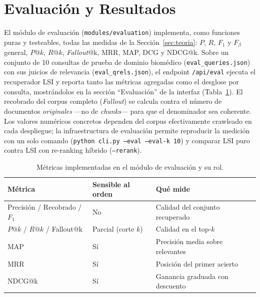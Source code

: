 \documentclass[runningheads,a4paper,14pts]{llncs}
\begin{document}
	\section{Evaluación y Resultados}\label{sec:evaluacion}
	
	El módulo de evaluación (\texttt{modules/evaluation}) implementa, como funciones
	puras y testeables, todas las medidas de la Sección~\ref{sec:teoria}: $P$, $R$,
	$F_1$ y $F_\beta$ general, $P@k$, $R@k$, \emph{Fallout}@k, MRR, MAP, DCG y
	NDCG@k. Sobre un conjunto de 10 consultas de prueba de dominio biomédico
	(\texttt{eval\_queries.json}) con sus juicios de relevancia
	(\texttt{eval\_qrels.json}), el endpoint \texttt{/api/eval} ejecuta el
	recuperador LSI y reporta tanto las métricas agregadas como el desglose por
	consulta, mostrándolos en la sección ``Evaluación'' de la interfaz
	(Tabla~\ref{tab:metricas}). El recobrado del corpus completo (\emph{Fallout}) se
	calcula contra el número de documentos \emph{originales} ---no de \emph{chunks}---
	para que el denominador sea coherente. Los valores numéricos concretos dependen
	del corpus efectivamente crawleado en cada despliegue; la infraestructura de
	evaluación permite reproducir la medición con un solo comando
	(\texttt{python cli.py --eval --eval-k 10}) y comparar LSI puro contra LSI con
	re-ranking híbrido (\texttt{--rerank}).
	
	\begin{table}[t]
		\centering
		\caption{Métricas implementadas en el módulo de evaluación y su rol.}
		\label{tab:metricas}
		\begin{tabular}{@{}lll@{}}
			\toprule
			\textbf{Métrica} & \textbf{Sensible al orden} & \textbf{Qué mide} \\
			\midrule
			Precisión / Recobrado / $F_1$ & No & Calidad del conjunto recuperado \\
			$P@k$ / $R@k$ / Fallout@k      & Parcial (corte $k$) & Calidad en el top-$k$ \\
			MAP                            & Sí & Precisión media sobre relevantes \\
			MRR                            & Sí & Posición del primer acierto \\
			NDCG@k                         & Sí & Ganancia graduada con descuento \\
			\bottomrule
		\end{tabular}
	\end{table}
	
\end{document}
